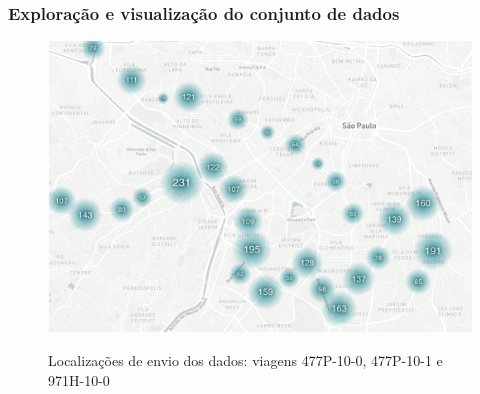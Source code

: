 \documentclass{beamer}
\begin{document}
\begin{frame}
\frametitle{Exploração e visualização do conjunto de dados}
\begin{figure}[H]%
	\centering
 	  \caption{Localizações de envio dos dados: viagens 477P-10-0, 477P-10-1 e 971H-10-0}
		\includegraphics[width=0.7\linewidth]{map_477p971h}
	\label{fig:map_477p971h}
\end{figure}
\end{frame}
\end{document}
